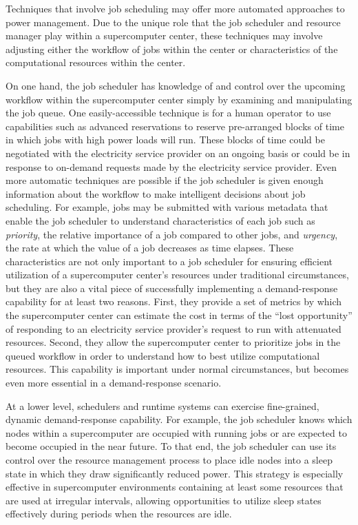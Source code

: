 Techniques that involve job scheduling may offer more automated
approaches to power management.  Due to the unique role that the job
scheduler and resource manager play within a supercomputer center,
these techniques may involve adjusting either the workflow of jobs
within the center or characteristics of the computational resources
within the center.

On one hand, the job scheduler has knowledge of and control over the
upcoming workflow within the supercomputer center simply by examining
and manipulating the job queue.  One easily-accessible technique is
for a human operator to use capabilities such as advanced reservations
to reserve pre-arranged blocks of time in which jobs with high power
loads will run.  These blocks of time could be negotiated with the
electricity service provider on an ongoing basis or could be in response to
on-demand requests made by the electricity service provider.  Even more
automatic techniques are possible if the job scheduler is given enough
information about the workflow to make intelligent decisions about job
scheduling.  For example, jobs may be submitted with various metadata
that enable the job scheduler to understand characteristics of each
job such as \textit{priority}, the relative importance of a job
compared to other jobs, and \textit{urgency}, the rate at which the
value of a job decreases as time elapses.  These characteristics are
not only important to a job scheduler for ensuring efficient
utilization of a supercomputer center's resources under traditional
circumstances, but they are also a vital piece of successfully
implementing a demand-response capability for at least two reasons.
First, they provide a set of metrics by which the supercomputer center
can estimate the cost in terms of the ``lost opportunity'' of
responding to an electricity service provider's request to run with
attenuated resources.  Second, they allow the supercomputer center to
prioritize jobs in the queued workflow in order to understand how to
best utilize computational resources.  This capability is important
under normal circumstances, but becomes even more essential in a
demand-response scenario.

At a lower level, schedulers and runtime systems can exercise 
fine-grained, dynamic demand-response capability.  
For example, the job scheduler knows which
nodes within a supercomputer are occupied with running jobs or are
expected to become occupied in the near future.  To that end, the job
scheduler can use its control over the resource management process to
place idle nodes into a sleep state in which they draw significantly
reduced power.  This strategy is especially effective in supercomputer
environments containing at least some resources that are used at
irregular intervals, allowing opportunities to utilize sleep states
effectively during periods when the resources are idle.  

